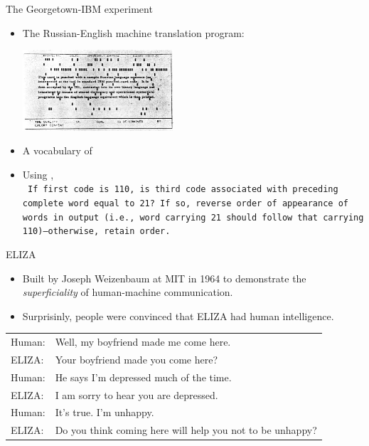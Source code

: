 \documentclass[usenames,dvipsnames,notes,11pt,aspectratio=169]{beamer}
\begin{document}
\begin{frame}
    {The Georgetown-IBM experiment}
    \begin{itemize}
        \item The Russian-English machine translation program:\\
            \begin{center}
            \includegraphics[height=3cm]{figures/ibm-experiment}
            \end{center}
        \item A vocabulary of 
        \item Using , \eg\\
            \texttt{
                If first code is 110, is third code associated with preceding complete word equal to 21? If so, reverse order of appearance of words in output (i.e., word carrying 21 should follow that carrying 110)---otherwise, retain order.}
    \end{itemize}
\end{frame}

\begin{frame}
    {ELIZA}
    \begin{itemize}
        \item Built by Joseph Weizenbaum at MIT in 1964 to demonstrate the \emph{superficiality} of human-machine communication.
        \item Surprisinly, people were convinced that ELIZA had human intelligence.
    \end{itemize}
    \bigskip
    \centering
    \begin{table}
        \begin{tabular}{ll}
            Human: & Well, my boyfriend made me come here.\\
    ELIZA: & Your boyfriend made you come here?\\
    Human: & He says I'm depressed much of the time.\\
    ELIZA: & I am sorry to hear you are depressed.\\
    Human: & It's true. I'm unhappy.\\
    ELIZA: & Do you think coming here will help you not to be unhappy?
        \end{tabular}
    \end{table}
\end{frame}
\end{document}
